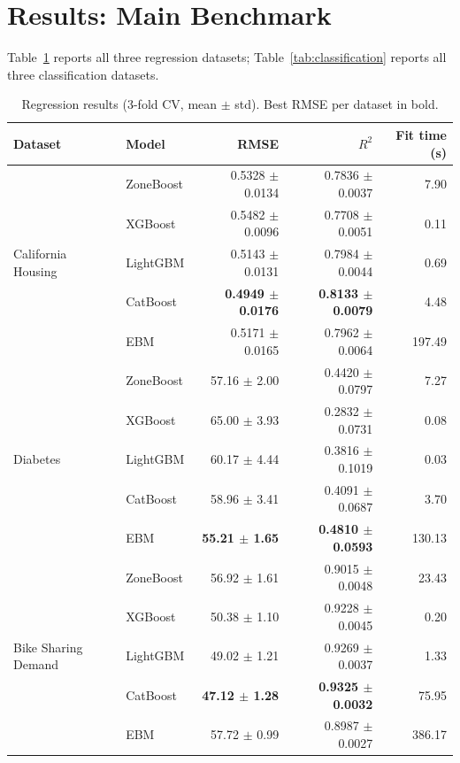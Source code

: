 \documentclass[11pt]{article}
\begin{document}
\section{Results: Main Benchmark}
\label{sec:results}

Table~\ref{tab:regression} reports all three regression datasets;
Table~\ref{tab:classification} reports all three classification datasets.

\begin{table}[t]
\centering
\caption{Regression results (3-fold CV, mean $\pm$ std). Best RMSE per
dataset in bold.}
\label{tab:regression}
\begin{tabular}{llrrr}
\toprule
Dataset & Model & RMSE & $R^2$ & Fit time (s) \\
\midrule
\multirow{5}{*}{California Housing}
 & ZoneBoost & 0.5328 $\pm$ 0.0134 & 0.7836 $\pm$ 0.0037 & 7.90 \\
 & XGBoost   & 0.5482 $\pm$ 0.0096 & 0.7708 $\pm$ 0.0051 & 0.11 \\
 & LightGBM  & 0.5143 $\pm$ 0.0131 & 0.7984 $\pm$ 0.0044 & 0.69 \\
 & CatBoost  & \textbf{0.4949 $\pm$ 0.0176} & \textbf{0.8133 $\pm$ 0.0079} & 4.48 \\
 & EBM       & 0.5171 $\pm$ 0.0165 & 0.7962 $\pm$ 0.0064 & 197.49 \\
\midrule
\multirow{5}{*}{Diabetes}
 & ZoneBoost & 57.16 $\pm$ 2.00 & 0.4420 $\pm$ 0.0797 & 7.27 \\
 & XGBoost   & 65.00 $\pm$ 3.93 & 0.2832 $\pm$ 0.0731 & 0.08 \\
 & LightGBM  & 60.17 $\pm$ 4.44 & 0.3816 $\pm$ 0.1019 & 0.03 \\
 & CatBoost  & 58.96 $\pm$ 3.41 & 0.4091 $\pm$ 0.0687 & 3.70 \\
 & EBM       & \textbf{55.21 $\pm$ 1.65} & \textbf{0.4810 $\pm$ 0.0593} & 130.13 \\
\midrule
\multirow{5}{*}{Bike Sharing Demand}
 & ZoneBoost & 56.92 $\pm$ 1.61 & 0.9015 $\pm$ 0.0048 & 23.43 \\
 & XGBoost   & 50.38 $\pm$ 1.10 & 0.9228 $\pm$ 0.0045 & 0.20 \\
 & LightGBM  & 49.02 $\pm$ 1.21 & 0.9269 $\pm$ 0.0037 & 1.33 \\
 & CatBoost  & \textbf{47.12 $\pm$ 1.28} & \textbf{0.9325 $\pm$ 0.0032} & 75.95 \\
 & EBM       & 57.72 $\pm$ 0.99 & 0.8987 $\pm$ 0.0027 & 386.17 \\
\bottomrule
\end{tabular}
\end{table}
\end{document}
